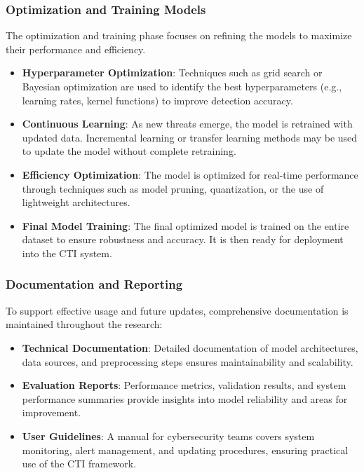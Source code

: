 \documentclass[a4paper,twoside,12pt]{report}
\begin{document}
\subsubsection{Optimization and Training Models}
The optimization and training phase focuses on refining the models to maximize their performance and efficiency.

\begin{itemize}
    \item \textbf{Hyperparameter Optimization}: Techniques such as grid search or Bayesian optimization are used to identify the best hyperparameters (e.g., learning rates, kernel functions) to improve detection accuracy.
    \item \textbf{Continuous Learning}: As new threats emerge, the model is retrained with updated data. Incremental learning or transfer learning methods may be used to update the model without complete retraining.
    \item \textbf{Efficiency Optimization}: The model is optimized for real-time performance through techniques such as model pruning, quantization, or the use of lightweight architectures.
    \item \textbf{Final Model Training}: The final optimized model is trained on the entire dataset to ensure robustness and accuracy. It is then ready for deployment into the CTI system.
\end{itemize}

\subsubsection{Documentation and Reporting}
To support effective usage and future updates, comprehensive documentation is maintained throughout the research:

\begin{itemize}
    \item \textbf{Technical Documentation}: Detailed documentation of model architectures, data sources, and preprocessing steps ensures maintainability and scalability.
    \item \textbf{Evaluation Reports}: Performance metrics, validation results, and system performance summaries provide insights into model reliability and areas for improvement.
    \item \textbf{User Guidelines}: A manual for cybersecurity teams covers system monitoring, alert management, and updating procedures, ensuring practical use of the CTI framework.
\end{itemize}
\end{document}
